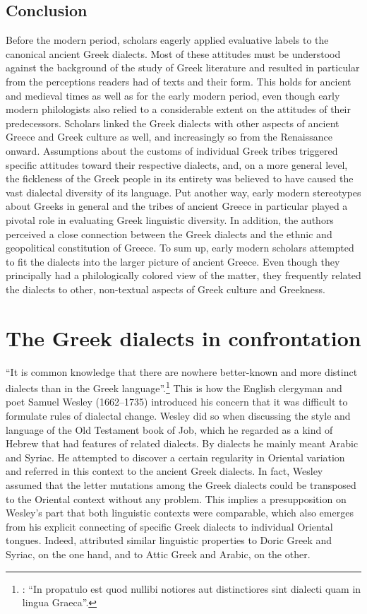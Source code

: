 \section{Conclusion}

Before the modern period, scholars eagerly applied evaluative labels to the canonical ancient Greek dialects. Most of these attitudes must be understood against the background of the study of Greek literature and resulted in particular from the perceptions readers had of texts and their form. This holds for ancient and medieval times as well as for the early modern period, even though early modern philologists also relied to a considerable extent on the attitudes of their predecessors. Scholars linked the Greek dialects with other aspects of ancient Greece and Greek culture as well, and increasingly so from the Renaissance onward. Assumptions about the customs of individual Greek tribes triggered specific attitudes toward their respective dialects, and, on a more general level, the fickleness of the Greek people in its entirety was believed to have caused the vast dialectal diversity of its language. Put another way, early modern stereotypes about Greeks in general and the tribes of ancient Greece in particular played a pivotal role in evaluating Greek linguistic diversity. In addition, the authors perceived a close connection between the Greek dialects and the ethnic and geopolitical constitution of Greece. To sum up, early modern scholars attempted to fit the dialects into the larger picture of ancient Greece. Even though they principally had a philologically colored view of the matter, they frequently related the dialects to other, non-textual aspects of Greek culture and Greekness.

\chapter{The Greek dialects in confrontation}

“It is common knowledge that there are nowhere better-known and more distinct dialects than in the Greek language”.\footnote{\citet[23]{Wesley1736}: “In propatulo est quod nullibi notiores aut distinctiores sint dialecti quam in lingua Graeca”.} This is how the English clergyman and poet Samuel Wesley (1662–1735) introduced his concern that it was difficult to formulate rules of dialectal change. Wesley did so when discussing the style and language of the Old Testament book of Job, which he regarded as a kind of Hebrew that had features of related dialects. By dialects he mainly meant Arabic and Syriac. He attempted to discover a certain regularity in Oriental variation and referred in this context to the ancient Greek dialects. In fact, Wesley assumed that the letter mutations among the Greek dialects could be transposed to the Oriental context without any problem. This implies a presupposition on Wesley’s part that both linguistic contexts were comparable, which also emerges from his explicit connecting of specific Greek dialects to individual Oriental tongues. Indeed, \citet[24]{Wesley1736} attributed similar linguistic properties to Doric Greek and Syriac, on the one hand, and to Attic Greek and Arabic, on the other.

